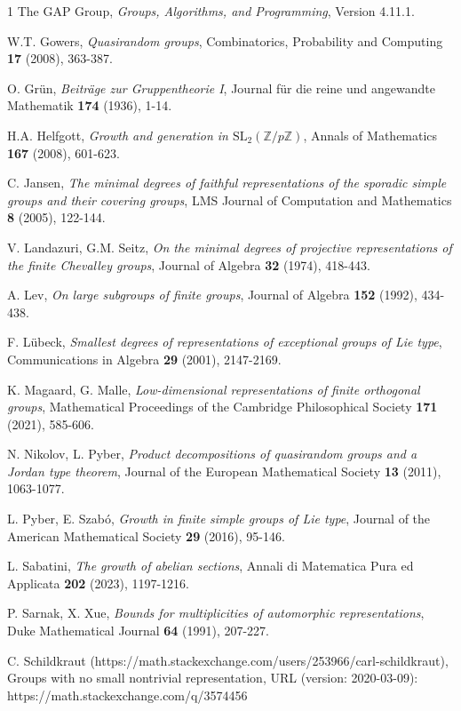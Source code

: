 \documentclass{daj}
\theoremstyle{definition}
\theoremstyle{remark}
\newcommand{\SL}{\mathrm{SL}}
\begin{document}
\begin{thebibliography}{1}
 The GAP Group,
\textit{Groups, Algorithms, and Programming}, Version 4.11.1.

 W.T. Gowers,
\textit{Quasirandom groups},
Combinatorics, Probability and Computing \textbf{17} (2008), 363-387.

 O. Gr\"un,
\textit{Beitr\"age zur Gruppentheorie I},
Journal f\"ur die reine und angewandte Mathematik \textbf{174} (1936), 1-14.

 H.A. Helfgott,
\textit{Growth and generation in $\SL_2(\mathbb{Z}/p\mathbb{Z})$},
Annals of Mathematics \textbf{167} (2008), 601-623.

 C. Jansen,
\textit{The minimal degrees of faithful representations of the sporadic simple groups and their covering groups},
LMS Journal of Computation and Mathematics \textbf{8} (2005), 122-144.

 V. Landazuri, G.M. Seitz,
\textit{On the minimal degrees of projective representations of the finite Chevalley groups},
Journal of Algebra \textbf{32} (1974), 418-443.

 A. Lev,
\textit{On large subgroups of finite groups},
Journal of Algebra \textbf{152} (1992), 434-438.

 F. L\"ubeck,
\textit{Smallest degrees of representations of exceptional groups of Lie type},
Communications in Algebra \textbf{29} (2001), 2147-2169.

 K. Magaard, G. Malle,
\textit{Low-dimensional representations of finite orthogonal groups},
Mathematical Proceedings of the Cambridge Philosophical Society \textbf{171} (2021), 585-606.

 N. Nikolov, L. Pyber,
\textit{Product decompositions of quasirandom groups and a Jordan type theorem},
Journal of the European Mathematical Society \textbf{13} (2011), 1063-1077.

 L. Pyber, E. Szab\'o,
\textit{Growth in finite simple groups of Lie type},
Journal of the American Mathematical Society \textbf{29} (2016), 95-146.

 L. Sabatini,
\textit{The growth of abelian sections},
Annali di Matematica Pura ed Applicata \textbf{202} (2023), 1197-1216.

 P. Sarnak, X. Xue,
\textit{Bounds for multiplicities of automorphic representations},
Duke Mathematical Journal \textbf{64} (1991), 207-227.

 C. Schildkraut
(https://math.stackexchange.com/users/253966/carl-schildkraut), Groups with no small nontrivial representation,
URL (version: 2020-03-09): https://math.stackexchange.com/q/3574456


\end{thebibliography}
\end{document}
